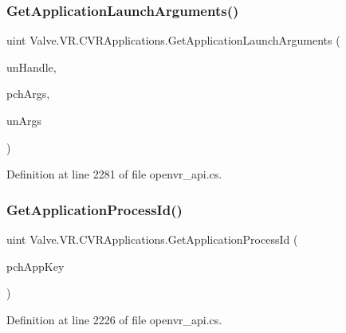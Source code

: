\subsubsection{\texorpdfstring{GetApplicationLaunchArguments()}{GetApplicationLaunchArguments()}}
{\footnotesize\ttfamily uint Valve.\+V\+R.\+C\+V\+R\+Applications.\+Get\+Application\+Launch\+Arguments (\begin{DoxyParamCaption}\item[{uint}]{un\+Handle,  }\item[{System.\+Text.\+String\+Builder}]{pch\+Args,  }\item[{uint}]{un\+Args }\end{DoxyParamCaption})}



Definition at line 2281 of file openvr\+\_\+api.\+cs.

\mbox{\label{class_valve_1_1_v_r_1_1_c_v_r_applications_aa87e0096153994caab063d57a3b7bd0b}} 
\subsubsection{\texorpdfstring{GetApplicationProcessId()}{GetApplicationProcessId()}}
{\footnotesize\ttfamily uint Valve.\+V\+R.\+C\+V\+R\+Applications.\+Get\+Application\+Process\+Id (\begin{DoxyParamCaption}\item[{string}]{pch\+App\+Key }\end{DoxyParamCaption})}



Definition at line 2226 of file openvr\+\_\+api.\+cs.

\mbox{\label{class_valve_1_1_v_r_1_1_c_v_r_applications_a74331bcd543f67a795e07b5b488ea492}} 
